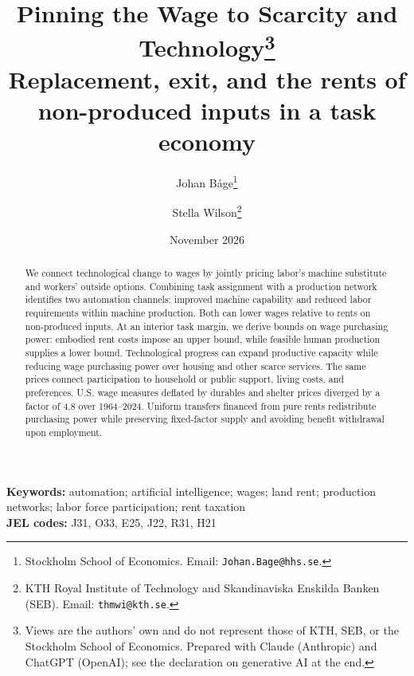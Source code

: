 \documentclass[12pt]{article}
\title{\bfseries Pinning the Wage to Scarcity and Technology\thanks{Views are the
  authors' own and do not represent those of KTH, SEB, or the Stockholm School of
  Economics. Prepared with Claude (Anthropic) and ChatGPT (OpenAI); see the
  declaration on generative AI at the end.
  }\\[7pt]
  \large\mdseries Replacement, exit, and the rents of non-produced inputs in a task economy}
\author{
  Johan B\r{a}ge\thanks{Stockholm School of Economics.
    Email: \texttt{Johan.Bage@hhs.se}.
  }
  \and
  Stella Wilson\thanks{KTH Royal Institute of Technology and Skandinaviska
    Enskilda Banken (SEB). Email: \texttt{thmwi@kth.se}.}
}
\date{November 2026}
\theoremstyle{plain}
\theoremstyle{definition}
\theoremstyle{remark}
\begin{document}
\maketitle

\begin{abstract}
\noindent We connect technological change to wages by jointly pricing labor's machine substitute and workers' outside options. Combining task assignment with a production network identifies two automation channels: improved machine capability and reduced labor requirements within machine production. Both can lower wages relative to rents on non-produced inputs. At an interior task margin, we derive bounds on wage purchasing power: embodied rent costs impose an upper bound, while feasible human production supplies a lower bound. Technological progress can expand productive capacity while reducing wage purchasing power over housing and other scarce services. The same prices connect participation to household or public support, living costs, and preferences. U.S. wage measures deflated by durables and shelter prices diverged by a factor of 4.8 over 1964--2024. Uniform transfers financed from pure rents redistribute purchasing power while preserving fixed-factor supply and avoiding benefit withdrawal upon employment.
\end{abstract}

\noindent\textbf{Keywords:} automation; artificial intelligence; wages; land rent; production networks; labor force participation; rent taxation\\
\textbf{JEL codes:} J31, O33, E25, J22, R31, H21

\end{document}
